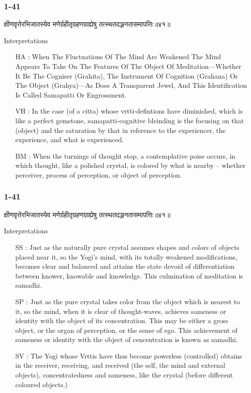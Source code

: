 \begin{frame}[fragile]\frametitle{1-41}
\begin{sanskrit}
क्षीणवृत्तेरभिजातस्येव मणेर्ग्रहीतृग्रहणग्राह्येषु तत्स्थतदञ्जनतासमापत्तिः॥४१॥
\end{sanskrit}

Interpretations
\begin{itemize}	
\item [HA]: When The Fluctuations Of The Mind Are Weakened The Mind Appears To Take On The Features Of The Object Of Meditation—Whether It Be The Cogniser (Grahita), The Instrument Of Cognition (Grahana) Or The Object (Grahya)—As Does A Transparent Jewel, And This Identification Is Called Samapatti Or Engrossment.
\item [VH]: In the case (of a citta) whose vrtti-defintions have diminished, which is like a perfect gemstone, samapatti-cognitive bleinding is the focusing on that (object) and the saturation by that in reference to the experiencer, the experience, and what is experienced.
\item [BM]: When the turnings of thought stop, a contemplative poise occurs, in which thought, like a polished crystal, is colored by what is nearby – whether perceiver, process of perception, or object of perception.
\end{itemize}
	
\end{frame}

\begin{frame}[fragile]\frametitle{1-41}
\begin{sanskrit}
क्षीणवृत्तेरभिजातस्येव मणेर्ग्रहीतृग्रहणग्राह्येषु तत्स्थतदञ्जनतासमापत्तिः॥४१॥
\end{sanskrit}

Interpretations
\begin{itemize}	
\item [SS]: Just as the naturally pure crystal assumes shapes and colors of objects placed near it, so the Yogi’s mind, with its totally weakened modifications, becomes clear and balanced and attains the state devoid of differentiation between knower, knowable and knowledge. This culmination of meditation is samadhi.
\item [SP]: Just as the pure crystal takes color from the object which is nearest to it, so the mind, when it is clear of thought-waves, achieves sameness or identity with the object of its concentration. This may be either a gross object, or the organ of perception, or the sense of ego. This achievement of sameness or identity with the object of cencentration is known as samadhi.
\item [SV]: The Yogi whose Vrttis have thus become powerless (controlled) obtains in the receiver, receiving, and received (the self, the mind and external objects), concentratedness and sameness, like the crystal (before different coloured objects.) 
\end{itemize}
	
\end{frame}

